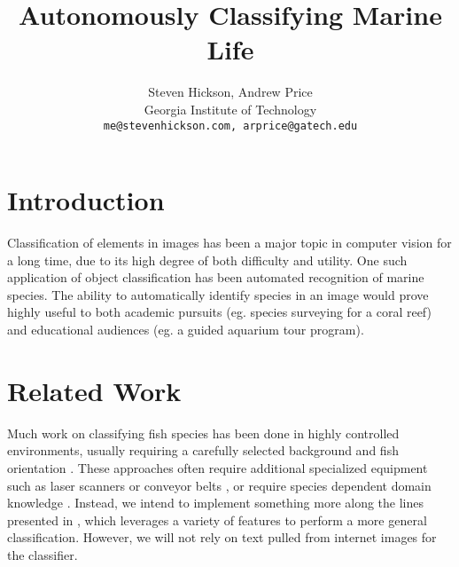 \documentclass[10pt,twocolumn,letterpaper]{article}
\begin{document}
\title{Autonomously Classifying Marine Life}

\author{Steven Hickson, Andrew Price \\
Georgia Institute of Technology\\
{\tt\small me@stevenhickson.com, arprice@gatech.edu}
}

\maketitle


\section{Introduction}
 Classification of elements in images has been a major topic in computer vision for a long time, due to its high degree of both difficulty and utility.
 One such application of object classification has been automated recognition of marine species.
 The ability to automatically identify species in an image would prove highly useful to both academic pursuits (eg. species surveying for a coral reef) and educational audiences (eg. a guided aquarium tour program).

\section{Related Work}
 Much work on classifying fish species has been done in highly controlled environments, usually requiring a carefully selected background and fish orientation \cite{white2006automated}.
 These approaches often require additional specialized equipment such as laser scanners or conveyor belts \cite{storbeck2001fish}, or require species dependent domain knowledge \cite{thonnat1988expert}.
  Instead, we intend to implement something more along the lines presented in \cite{berg2006animals}, which leverages a variety of features to perform a more general classification.
  However, we will not rely on text pulled from internet images for the classifier.
\end{document}
